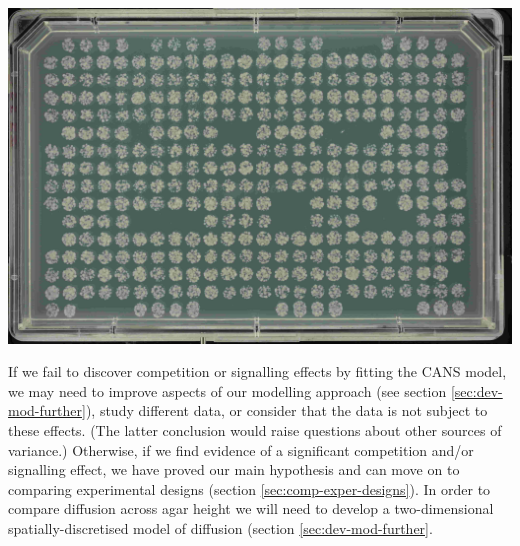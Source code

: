 \begin{Figure}
  \centering
  \includegraphics[width=\linewidth]{DLR00012647-2009-07-02_23-12-49}
  \label{fig:gaps}
\end{Figure}


If we fail to discover competition or signalling effects by fitting
the CANS model, we may need to improve aspects of our modelling
approach (see section \ref{sec:dev-mod-further}), study different
data, or consider that the data is not subject to these effects. (The
latter conclusion would raise questions about other sources of
variance.) Otherwise, if we find evidence of a significant competition
and/or signalling effect, we have proved our main hypothesis and can
move on to comparing experimental designs (section
\ref{sec:comp-exper-designs}). In order to compare diffusion across
agar height we will need to develop a two-dimensional
spatially-discretised model of diffusion (section
\ref{sec:dev-mod-further}.


